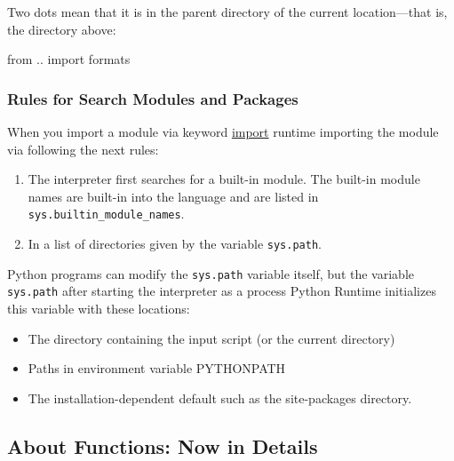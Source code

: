 \documentclass[
]{article}
\newenvironment{Shaded}{}{}
\newcommand{\ImportTok}[1]{#1}
\newcommand{\NormalTok}[1]{#1}
\begin{document}
Two dots mean that it is in the parent directory of the current
location---that is, the directory above:

\begin{Shaded}
\begin{Highlighting}[]
\ImportTok{from}\NormalTok{ .. }\ImportTok{import}\NormalTok{ formats }
\end{Highlighting}
\end{Shaded}

\hypertarget{rules-for-search-modules-and-packages}{%
\subsubsection{Rules for Search Modules and
Packages}\label{rules-for-search-modules-and-packages}}

When you import a module via keyword
\href{https://docs.python.org/3/reference/simple_stmts.html\#import}{import}
runtime importing the module via following the next rules:

\begin{enumerate}
\def\labelenumi{\arabic{enumi}.}
\item
  The interpreter first searches for a built-in module. The built-in
  module names are built-in into the language and are listed in
  \texttt{sys.builtin\_module\_names}.
\item
  In a list of directories given by the variable \texttt{sys.path}.
\end{enumerate}

Python programs can modify the \texttt{sys.path} variable itself, but
the variable \texttt{sys.path} after starting the interpreter as a
process Python Runtime initializes this variable with these locations:

\begin{itemize}
\item
  The directory containing the input script (or the current directory)
\item
  Paths in environment variable PYTHONPATH
\item
  The installation-dependent default such as the site-packages
  directory.
\end{itemize}

\hypertarget{about-functions-now-in-details}{%
\subsection{About Functions: Now in
Details}\label{about-functions-now-in-details}}
\end{document}
